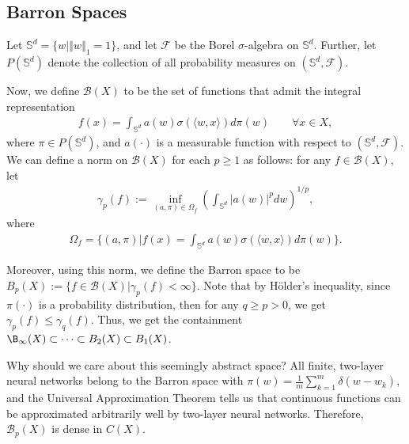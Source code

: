 \documentclass{article}
\begin{document}
\subsection{Barron Spaces}

Let $\mathbb{S}^d = \{ w| \left\Vert w \right\Vert_1 = 1\}$, and let $\mathcal{F}$ be the Borel $\sigma$-algebra on $\mathbb{S}^d$. Further, let $P(\mathbb{S}^d)$ denote the collection of all probability measures on $(\mathbb{S}^d, \mathcal{F})$. 

Now, we define $\mathcal{B}(X)$ to be the set of functions that admit the integral representation 
\begin{align*}
    f(x) = \int_{\mathbb{S}^d} a(w) \sigma(\langle w, x \rangle) d \pi(w) \qquad \forall x \in X,
\end{align*}
where $\pi \in P(\mathbb{S}^d)$, and $a(\cdot)$ is a measurable function with respect to $(\mathbb{S}^d, \mathcal{F})$. We can define a norm on $\mathcal{B}(X)$ for each $p \geq 1$ as follows: for any $f \in \mathcal{B}(X)$, let 
\begin{align*}
    \gamma_p(f) := \underset{(a, \pi) \in \Omega_f}{\inf} \left( \int_{\mathbb{S}^d} |a(w)|^p dw \right)^{1/p},
\end{align*}
where
\begin{align*}
    \Omega_f = \bigg\{(a, \pi) |f(x) = \int_{\mathbb{S}^d} a(w) \sigma(\langle w, x \rangle) d \pi(w) \bigg\}.
\end{align*}

Moreover, using this norm, we define the Barron space to be $B_p(X) := \{ f \in \mathcal{B}(X) | \gamma_p(f) < \infty\}$. Note that by Hölder's inequality, since $\pi(\cdot)$ is a probability distribution, then for any $q \geq p > 0$, we get $\gamma_p(f) \leq \gamma_q(f)$. Thus, we get the containment $\B_{\infty}(X) \subset \cdots \subset B_2(X) \subset B_1(X)$. 

Why should we care about this seemingly abstract space? All finite, two-layer neural networks belong to the Barron space with $\pi(w) = \frac{1}{m}\sum_{k=1}^m \delta(w- \hat{w}_k)$, and the Universal Approximation Theorem tells us that continuous functions can be approximated arbitrarily well by two-layer neural networks. Therefore, $\mathcal{B}_p(X)$ is dense in $C(X)$. 
\end{document}
